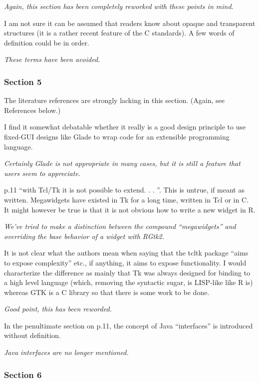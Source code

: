 \documentclass{article}
\begin{document}
\emph{Again, this section has been completely reworked with these points in mind.}

I am not sure it can be assumed that readers know about opaque and transparent
structures (it is a rather recent feature of the C standards). A few words of
definition could be in order.

\emph{These terms have been avoided.}

\subsubsection*{Section 5}

The literature references are strongly lacking in this section. (Again, see References
below.)

I find it somewhat debatable whether it really is a good design principle to
use fixed-GUI designs like Glade to wrap code for an extensible programming
language.

\emph{Certainly Glade is not appropriate in many cases, but it is still a feature that users seem to appreciate.}

p.11 ``with Tcl/Tk it is not possible to extend. . . ''. This is untrue, if meant as
written. Megawidgets have existed in Tk for a long time, written in Tcl or in
C. It might however be true is that it is not obvious how to write a new widget
in R.

\emph{We've tried to make a distinction between the compound ``megawidgets'' and overriding the base behavior of a widget with RGtk2.}

It is not clear what the authors mean when saying that the tcltk package ``aims
to expose complexity'' etc., if anything, it aims to expose functionality. I would
characterize the difference as mainly that Tk was always designed for binding
to a high level language (which, removing the syntactic sugar, is LISP-like like
R is) whereas GTK is a C library so that there is some work to be done.

\emph{Good point, this has been reworded.}

In the penultimate section on p.11, the concept of Java ``interfaces'' is introduced
without definition.

\emph{Java interfaces are no longer mentioned.}

\subsubsection*{Section 6}
\end{document}
